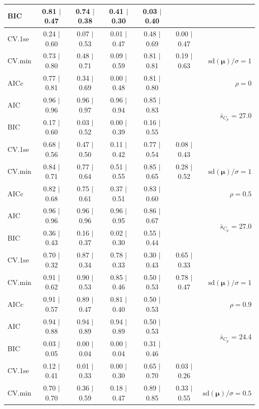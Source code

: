 \documentclass[12pt]{article}
\newcommand{\mr}[1]{\mathrm{#1}}
\newcommand{\bm}[1]{\mathbf{#1}}
\begin{document}
\begin{table}[p]
\begin{center}
\begin{tabular}{l*{5}{c}|r}
BIC & 0.81 $\mid$ 0.47 & 0.74 $\mid$ 0.38 & 0.41 $\mid$ 0.30 & 0.03 $\mid$ 0.40 & & \\
 \hline 
CV.1se & 0.24 $\mid$ 0.60 & 0.07 $\mid$ 0.53 & 0.01 $\mid$ 0.47 & 0.48 $\mid$ 0.69 & 0.00 $\mid$ 0.47 &\\
CV.min & 0.73 $\mid$ 0.80 & 0.48 $\mid$ 0.71 & 0.09 $\mid$ 0.59 & 0.81 $\mid$ 0.81 & 0.19 $\mid$ 0.63 &  $\mr{sd}(\bm{\mu})/\sigma=1$ \\
AICc & 0.77 $\mid$ 0.81 & 0.34 $\mid$ 0.69 & 0.00 $\mid$ 0.48 & 0.81 $\mid$ 0.80 & & $\rho=0$ \\
AIC & 0.96 $\mid$ 0.96 & 0.96 $\mid$ 0.97 & 0.96 $\mid$ 0.94 & 0.85 $\mid$ 0.83 & & \multirow{2}{*}{$\bar{s}_{C_p}$ = 27.0} \\
BIC & 0.17 $\mid$ 0.60 & 0.03 $\mid$ 0.52 & 0.00 $\mid$ 0.39 & 0.16 $\mid$ 0.55 & & \\
 \hline 
CV.1se & 0.68 $\mid$ 0.56 & 0.47 $\mid$ 0.50 & 0.11 $\mid$ 0.42 & 0.77 $\mid$ 0.54 & 0.08 $\mid$ 0.43 &\\
CV.min & 0.84 $\mid$ 0.71 & 0.77 $\mid$ 0.64 & 0.51 $\mid$ 0.55 & 0.85 $\mid$ 0.65 & 0.28 $\mid$ 0.52 &  $\mr{sd}(\bm{\mu})/\sigma=1$ \\
AICc & 0.82 $\mid$ 0.68 & 0.75 $\mid$ 0.61 & 0.37 $\mid$ 0.51 & 0.83 $\mid$ 0.60 & & $\rho=0.5$ \\
AIC & 0.96 $\mid$ 0.96 & 0.96 $\mid$ 0.96 & 0.96 $\mid$ 0.95 & 0.86 $\mid$ 0.67 & & \multirow{2}{*}{$\bar{s}_{C_p}$ = 27.0} \\
BIC & 0.36 $\mid$ 0.43 & 0.16 $\mid$ 0.37 & 0.02 $\mid$ 0.30 & 0.55 $\mid$ 0.44 & & \\
 \hline 
CV.1se & 0.70 $\mid$ 0.32 & 0.87 $\mid$ 0.34 & 0.78 $\mid$ 0.33 & 0.30 $\mid$ 0.43 & 0.65 $\mid$ 0.33 &\\
CV.min & 0.91 $\mid$ 0.62 & 0.90 $\mid$ 0.53 & 0.85 $\mid$ 0.46 & 0.50 $\mid$ 0.53 & 0.78 $\mid$ 0.47 &  $\mr{sd}(\bm{\mu})/\sigma=1$ \\
AICc & 0.91 $\mid$ 0.57 & 0.89 $\mid$ 0.47 & 0.81 $\mid$ 0.40 & 0.50 $\mid$ 0.53 & & $\rho=0.9$ \\
AIC & 0.94 $\mid$ 0.88 & 0.94 $\mid$ 0.89 & 0.94 $\mid$ 0.89 & 0.50 $\mid$ 0.53 & & \multirow{2}{*}{$\bar{s}_{C_p}$ = 24.4} \\
BIC & 0.03 $\mid$ 0.05 & 0.00 $\mid$ 0.04 & 0.00 $\mid$ 0.04 & 0.31 $\mid$ 0.46 & & \\
 \hline 
CV.1se & 0.12 $\mid$ 0.41 & 0.01 $\mid$ 0.33 & 0.00 $\mid$ 0.30 & 0.65 $\mid$ 0.70 & 0.03 $\mid$ 0.26 &\\
CV.min & 0.70 $\mid$ 0.70 & 0.36 $\mid$ 0.59 & 0.18 $\mid$ 0.47 & 0.89 $\mid$ 0.85 & 0.33 $\mid$ 0.55 &  $\mr{sd}(\bm{\mu})/\sigma=0.5$ \\

\end{tabular}
\end{center}
\end{table}
\end{document}
